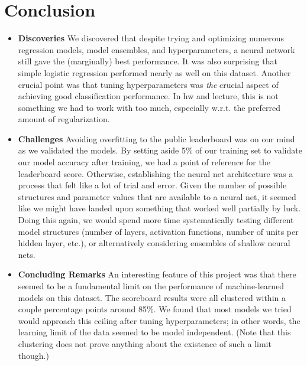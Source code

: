 \section{Conclusion}
\medskip
\begin{itemize}
  
\item \textbf{Discoveries} 
  We discovered that despite trying and optimizing numerous regression models, model ensembles, and hyperparameters, a neural network still gave the (marginally) best performance. It was also surprising that simple logistic regression performed nearly as well on this dataset. Another crucial point was that tuning hyperparameters was \textit{the} crucial aspect of achieving good classification performance. In hw and lecture, this is not something we had to work with too much, especially w.r.t. the preferred amount of regularization. 
  
\item \textbf{Challenges} 
  Avoiding overfitting to the public leaderboard was on our mind as we validated the models. By setting aside 5\% of our training set to validate our model accuracy after training, we had a point of reference for the leaderboard score. Otherwise, establishing the neural net architecture was a process that felt like a lot of trial and error. Given the number of possible structures and parameter values that are available to a neural net, it seemed like we might have landed upon something that worked well partially by luck. Doing this again, we would spend more time systematically testing different model structures (number of layers, activation functions, number of units per hidden layer, etc.), or alternatively considering ensembles of shallow neural nets. 
  
\item \textbf{Concluding Remarks} 
  An interesting feature of this project was that there seemed to be a fundamental limit on the performance of machine-learned models on this dataset. The scoreboard results were all clustered within a couple percentage points around 85\%. We found that most models we tried would approach this ceiling after tuning hyperparameters; in other words, the learning limit of the data seemed to be model independent. (Note that this clustering does not prove anything about the existence of such a limit though.)
  
\end{itemize}






